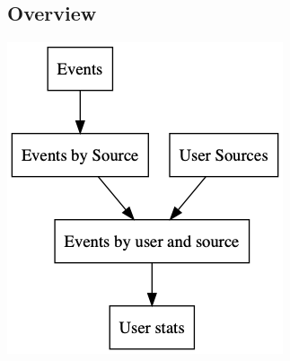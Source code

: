 \documentclass[11pt]{article}
\begin{document}
\subsection{Overview}
\label{sec:org53c7bf1}
\begin{center}
\includegraphics[width=.9\linewidth]{flex.png}
\end{center}
\end{document}
